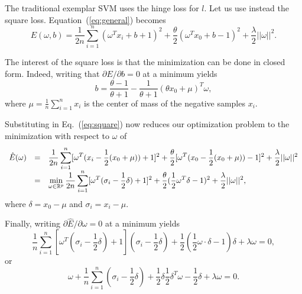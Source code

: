 \documentclass[12pt,letterpaper]{article}
\begin{document}
The traditional exemplar SVM uses the hinge loss for $l$. Let us use
instead the square loss. Equation~(\ref{eq:general}) becomes
\begin{equation}
E(\omega,b)=\frac{1}{2n}\sum_{i=1}^n (\omega^T x_i+b+1)^2+ \frac{\theta}{2}(\omega^T
x_0+b-1)^2+\frac{\lambda}{2} ||\omega||^2.
\label{eq:square}
\end{equation}

The interest of the square loss is that the minimization can be done
in closed form. Indeed, writing that $\partial E/\partial b=0$ at a
minimum yields
\begin{equation}
b=\dfrac{\theta-1}{\theta+1}-\dfrac{1}{\theta +1}(\theta x_0+\mu)^T \omega,
\end{equation}
where $\mu=\frac{1}{n}\sum_{i=1}^n x_i$ is the center of mass of the
negative samples $x_i$.

Substituting in Eq.~(\ref{eq:square}) now reduces our optimization problem
to the minimization with respect to $\omega$ of
\begin{equation}
\begin{array}{lcl}\hat{E}(\omega)&=&
\displaystyle\frac{1}{2n}\sum_{i=1}^n [\omega^T (x_i-\frac{1}{2}(x_0+\mu))+1]^2
+\frac{\theta}{2}[\omega^T (x_0-\frac{1}{2}(x_0+\mu))-1]^2+\frac{\lambda}{2}||\omega||^2\\
&=&
\displaystyle\min_{\omega\in\mathbb{R}^p}
\frac{1}{2n}\sum_{i=1}^n [\omega^T (\sigma_i-\frac{1}{2}\delta) +1]^2
+\frac{\theta}{2}(\frac{1}{2}\omega^T\delta-1)^2+\frac{\lambda}{2}||\omega||^2,
\end{array}
\label{eq:weq}
\end{equation}
where $\delta=x_0-\mu$ and $\sigma_i=x_i-\mu$.

Finally, writing $\partial\hat{E}/\partial \omega=0$ at a minimum yields
\begin{equation}
\frac{1}{n}\sum_{i=1}^n [\omega^T(\sigma_i-\frac{1}{2}\delta)+1](\sigma_i-\frac{1}{2}\delta)
+\frac{1}{2}(\frac{1}{2}\omega\cdot\delta-1)\delta +\lambda \omega=0,
\end{equation}
or
\begin{equation}
[\frac{1}{n}\sum_{i=1}^n(\sigma_i-\frac{1}{2}\delta)(\sigma_i^T-\frac{1}{2}\delta^T)] \omega
+\frac{1}{n}\sum_{i=1}^n (\sigma_i-\frac{1}{2}\delta) +\frac{1}{2}\delta\frac{1}{2}\delta^T \omega -\frac{1}{2}\delta +\lambda \omega
=0.
\end{equation}
\end{document}
